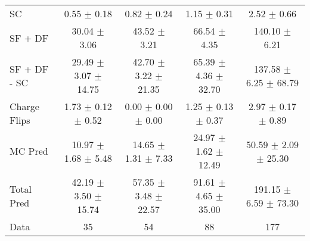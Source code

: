 \begin{tabular}{l|cccc}
                                 SC &  0.55 $\pm$  0.18 &  0.82 $\pm$  0.24 &  1.15 $\pm$  0.31 &  2.52 $\pm$  0.66 \\
                            SF + DF & 30.04 $\pm$  3.06 & 43.52 $\pm$  3.21 & 66.54 $\pm$  4.35 & 140.10 $\pm$  6.21 \\
\hline
                       SF + DF - SC & 29.49 $\pm$  3.07 $\pm$ 14.75 & 42.70 $\pm$  3.22 $\pm$ 21.35 & 65.39 $\pm$  4.36 $\pm$ 32.70 & 137.58 $\pm$  6.25 $\pm$ 68.79 \\
\hline\hline
                       Charge Flips &  1.73 $\pm$  0.12 $\pm$  0.52 &  0.00 $\pm$  0.00 $\pm$  0.00 &  1.25 $\pm$  0.13 $\pm$  0.37 &  2.97 $\pm$  0.17 $\pm$  0.89 \\
\hline
                            MC Pred & 10.97 $\pm$  1.68 $\pm$  5.48 & 14.65 $\pm$  1.31 $\pm$  7.33 & 24.97 $\pm$  1.62 $\pm$ 12.49 & 50.59 $\pm$  2.09 $\pm$ 25.30 \\
\hline
                         Total Pred & 42.19 $\pm$  3.50 $\pm$ 15.74 & 57.35 $\pm$  3.48 $\pm$ 22.57 & 91.61 $\pm$  4.65 $\pm$ 35.00 & 191.15 $\pm$  6.59 $\pm$ 73.30 \\
\hline\hline
                               Data &    35 &    54 &    88 &   177 \\
\hline\hline
\end{tabular}

